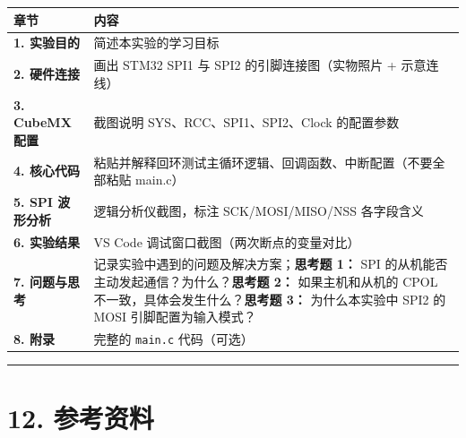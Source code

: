\documentclass[
  chinese,
  UTF8,
  oneside,
  openany]{ctexbook}
\begin{document}
\begin{longtable}[]{@{}
  >{\raggedright\arraybackslash}p{}
  >{\raggedright\arraybackslash}p{}@{}}
\toprule\noalign{}
\begin{minipage}[b]{\linewidth}\raggedright
章节
\end{minipage} & \begin{minipage}[b]{\linewidth}\raggedright
内容
\end{minipage} \\
\midrule\noalign{}
\endhead
\bottomrule\noalign{}
\endlastfoot
\textbf{1. 实验目的} & 简述本实验的学习目标 \\
\textbf{2. 硬件连接} & 画出 STM32 SPI1 与 SPI2 的引脚连接图（实物照片 +
示意连线） \\
\textbf{3. CubeMX 配置} & 截图说明 SYS、RCC、SPI1、SPI2、Clock
的配置参数 \\
\textbf{4. 核心代码} &
粘贴并解释回环测试主循环逻辑、回调函数、中断配置（不要全部粘贴
main.c） \\
\textbf{5. SPI 波形分析} & 逻辑分析仪截图，标注 SCK/MOSI/MISO/NSS
各字段含义 \\
\textbf{6. 实验结果} & VS Code 调试窗口截图（两次断点的变量对比） \\
\textbf{7. 问题与思考} & 记录实验中遇到的问题及解决方案；\textbf{思考题
1：} SPI 的从机能否主动发起通信？为什么？\textbf{思考题 2：}
如果主机和从机的 CPOL 不一致，具体会发生什么？\textbf{思考题 3：}
为什么本实验中 SPI2 的 MOSI 引脚配置为输入模式？ \\
\textbf{8. 附录} & 完整的 \texttt{main.c} 代码（可选） \\
\end{longtable}

\begin{center}\rule{0.5\linewidth}{0.5pt}\end{center}

\section{12. 参考资料}\label{ux53c2ux8003ux8d44ux6599-3}
\end{document}
